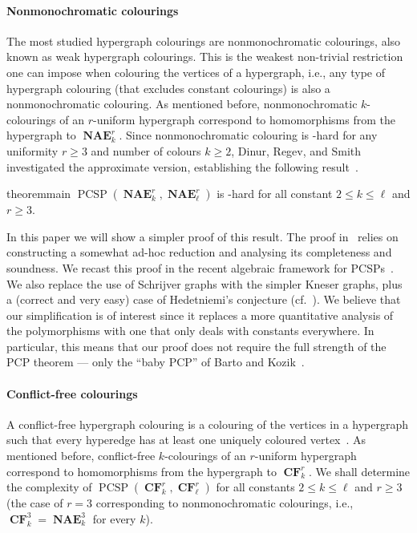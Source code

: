 \documentclass[a4paper,11pt]{article}
\newcommand{\2}{\vec{2}}
\newcommand{\1}{\vec{1}}
\newcommand{\0}{\vec{0}}
\DeclareMathOperator{\PCSP}{PCSP}
\DeclareMathOperator{\NAE}{\mathbf{NAE}}
\DeclareMathOperator{\CF}{\mathbf{CF}}
\theoremstyle{plain}
\theoremstyle{definition}
\begin{document}
\paragraph{Nonmonochromatic colourings}
The most studied hypergraph colourings are nonmonochromatic colourings, also known as weak hypergraph colourings.
This is the weakest non-trivial restriction one can impose when colouring the
vertices of a hypergraph, i.e., any type of hypergraph colouring (that excludes constant colourings) is also a nonmonochromatic colouring. 
As mentioned before, nonmonochromatic $k$-colourings of an $r$-uniform hypergraph correspond to homomorphisms from the hypergraph to $\NAE^r_k$.
Since nonmonochromatic colouring is \NP-hard for any uniformity $r\geq 3$ and
number of colours $k \geq 2$, Dinur, Regev, and Smith investigated the
approximate version, establishing  the following result~\cite{DRS05}.
\begin{restatable}{theorem}{main}\label{thm:main}
$\PCSP(\NAE_k^r, \NAE_\ell^r)$ is \NP-hard
for all constant $2 \leq k \leq \ell$ and $r \geq 3$.
\end{restatable}

In this paper we will show a simpler proof of this result. The proof in~\cite{DRS05} relies on constructing a somewhat ad-hoc reduction and analysing its completeness and soundness.
We recast this proof
in the  recent algebraic framework for PCSPs~\cite{BBKO21}. 
We also replace the use of Schrijver graphs with the simpler Kneser graphs, plus
a (correct and very easy) case of Hedetniemi’s conjecture (cf.~). 
We believe that our simplification is of interest since it replaces a more quantitative analysis of the polymorphisms with one that only deals with constants everywhere. In particular, this means that our proof does not require the full strength of the PCP theorem --- only the ``baby PCP'' of Barto and Kozik~\cite{Barto22:soda}.

\paragraph{Conflict-free colourings}

A conflict-free hypergraph colouring is a colouring of the vertices in a
hypergraph such that every hyperedge has at least one uniquely coloured
vertex~\cite{Even03:sicomp,Smorodinsky2013}. 
As mentioned before, conflict-free $k$-colourings of an $r$-uniform hypergraph correspond to homomorphisms from the hypergraph to $\CF^r_k$.
We shall determine the complexity of $\PCSP(\CF^r_k,\CF^r_\ell)$ for all
constants $2\leq k\leq\ell$ and $r\geq 3$ (the case of $r=3$ corresponding to
nonmonochromatic colourings, i.e., $\CF^3_k=\NAE^3_k$ for every $k$).
\end{document}
